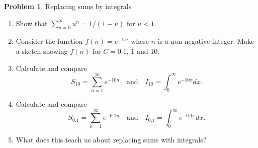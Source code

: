 \documentclass[10pt]{article}
\theoremstyle{definition}
\newtheorem{problem}{Problem}
\begin{document}
\begin{problem}
Replacing sums by integrals
\begin{enumerate}[label=(\alph*)]
  \item Show that $\sum_{n=0}^{\infty}u^n=1/(1-u)$ for $u<1$.
  \item Consider the function $f (n) = e^{-Cn}$ where $n$ is a non-negative integer. Make a sketch
        showing $f (n)$ for $C = 0.1$, $1$ and $10$.
  \item Calculate and compare
        $$S_{10}=\sum_{n=1}^{\infty}e^{-10n}\quad \text{and}\quad I_{10}=\int_0^\infty e^{-10x}dx.$$
  \item Calculate and compare
        $$S_{0.1}=\sum_{n=1}^{\infty}e^{-0.1n}\quad \text{and}\quad I_{0.1}=\int_0^\infty e^{-0.1x}dx.$$
  \item What does this teach us about replacing sums with integrals?
\end{enumerate}
\end{problem}
\end{document}
